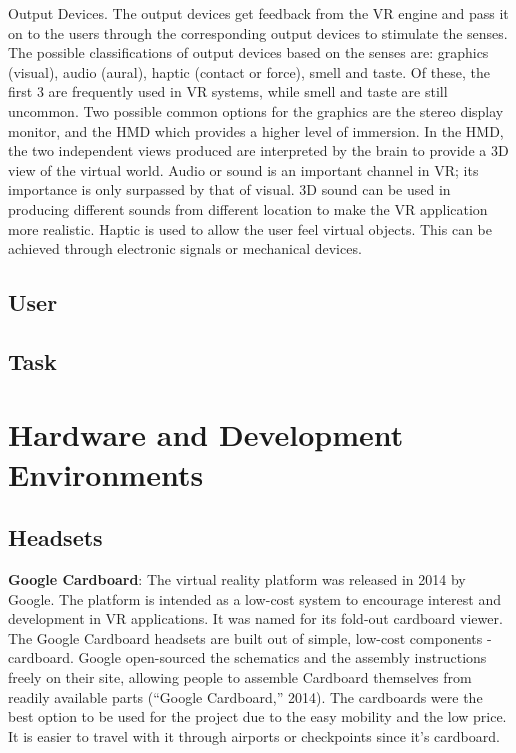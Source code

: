 Output Devices. The output devices get feedback from the VR engine and pass it on to the users through the corresponding output devices to stimulate the senses. The possible classifications of output devices based on the senses are: graphics (visual), audio (aural), haptic (contact or force), smell and taste. Of these, the first 3 are frequently used in VR systems, while smell and taste are still uncommon.
Two possible common options for the graphics are the stereo display monitor, and the HMD which provides a higher level of immersion. In the HMD, the two independent views produced are interpreted by the brain to provide a 3D view of the virtual world. Audio or sound is an important channel in VR; its importance is only surpassed by that of visual. 3D sound can be used in producing different sounds from different location to make the VR application more realistic.
Haptic is used to allow the user feel virtual objects. This can be achieved through electronic signals or mechanical devices.



\subsection{User}



\subsection{Task}



\section{Hardware and Development Environments}










\subsection{Headsets}
\textbf{Google Cardboard}: The virtual reality platform was released in
2014 by Google. The platform is intended as a low-cost system to
encourage interest and development in VR applications. It was
named for its fold-out cardboard viewer. The Google Cardboard
headsets are built out of simple, low-cost components -
cardboard. Google open-sourced the schematics and the
assembly instructions freely on their site, allowing people to
assemble Cardboard themselves from readily available parts (“Google Cardboard,” 2014). The
cardboards were the best option to be used for the project due to the easy mobility and the
low price. It is easier to travel with it through airports or checkpoints since it’s cardboard.
